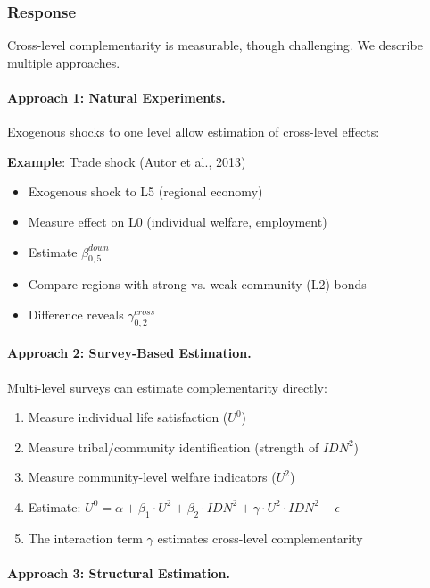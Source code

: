 \documentclass[12pt,a4paper]{article}
\begin{document}
\subsubsection{Response}

Cross-level complementarity is measurable, though challenging. We describe 
multiple approaches.

\paragraph{Approach 1: Natural Experiments.}

Exogenous shocks to one level allow estimation of cross-level effects:

\textbf{Example}: Trade shock (Autor et al., 2013)
\begin{itemize}[nosep]
\item Exogenous shock to L5 (regional economy)
\item Measure effect on L0 (individual welfare, employment)
\item Estimate $\beta^{down}_{0,5}$
\item Compare regions with strong vs. weak community (L2) bonds
\item Difference reveals $\gamma^{cross}_{0,2}$
\end{itemize}

\paragraph{Approach 2: Survey-Based Estimation.}

Multi-level surveys can estimate complementarity directly:
\begin{enumerate}[nosep]
\item Measure individual life satisfaction ($U^0$)
\item Measure tribal/community identification (strength of $IDN^2$)
\item Measure community-level welfare indicators ($U^2$)
\item Estimate: $U^0 = \alpha + \beta_1 \cdot U^2 + \beta_2 \cdot IDN^2 + 
\gamma \cdot U^2 \cdot IDN^2 + \epsilon$
\item The interaction term $\gamma$ estimates cross-level complementarity
\end{enumerate}

\paragraph{Approach 3: Structural Estimation.}
\end{document}
